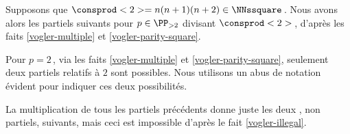 Supposons que $\consprod<2> = n(n+1)(n+2) \in \NNssquare$\,. Nous avons alors les \sftab[x] partiels suivants pour $p \in \PP_{>2}$ divisant $\consprod<2>$\,, d'après les faits \ref{vogler-multiple} et \ref{vogler-parity-square}.

\begin{center}
\end{center}


Pour $p = 2$\,, via les faits \ref{vogler-multiple} et \ref{vogler-parity-square}, seulement deux \sftab[x] partiels relatifs à $2$ sont possibles. Nous utilisons un abus de notation évident pour indiquer ces deux possibilités.

\begin{center}
\end{center}


La multiplication de tous les \sftab[x] partiels précédents donne juste les deux \sftab[x], non partiels, suivants, mais ceci est impossible d'après le fait \ref{vogler-illegal}.

\begin{center}
\end{center}